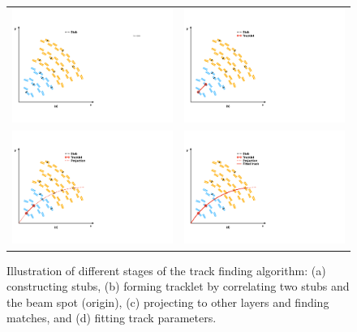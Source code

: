 \begin{figure}[tbh!]
 \begin{center}
  \begin{tabular}{cc}
   \includegraphics[width=.45\linewidth]{figures/Part2/Upgrade/tracklet1} &
   \includegraphics[width=.45\linewidth]{figures/Part2/Upgrade/tracklet2} \\
   \includegraphics[width=.45\linewidth]{figures/Part2/Upgrade/tracklet3} &
   \includegraphics[width=.45\linewidth]{figures/Part2/Upgrade/tracklet4} \\
  \end{tabular}
  \caption{Illustration of different stages of the track finding algorithm: (a) constructing stubs, (b) forming tracklet by correlating two stubs and the beam spot (origin), (c) projecting to other layers and finding matches, and (d) fitting track parameters.}
 \label{fig:algorithm}
 \end{center}
\end{figure}

